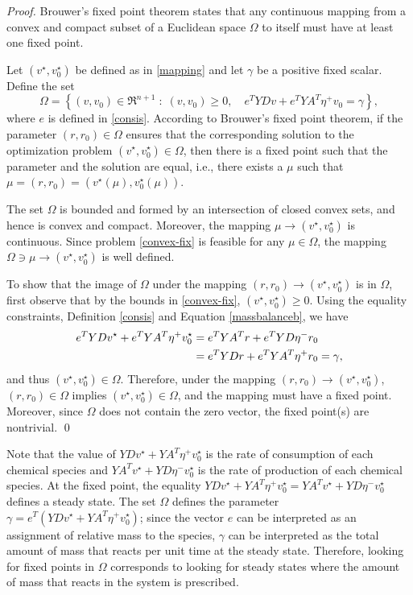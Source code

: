 \documentclass[smallextended]{svjour3}       %
\newcommand*{\0}{\mathbf{0}}
\newcommand*{\1}{\mathbf{1}}
\begin{document}
\begin{proof} 
	Brouwer's fixed point theorem states that any continuous mapping from a
	convex and compact subset of a Euclidean space $\Omega$ to itself must have
	at least one fixed point. 

	Let $(v^\star,v^\star_0)$ be defined as in \eqref{mapping} and let $\gamma$
	be a positive fixed scalar. Define the set 
	\[
	\Omega = \left\{ (v,v_0)\in	\Re^{n+1} \; : \; (v,v_0)\geq 0, 
		\quad e^TYDv + e^TYA^T\eta^+v_0 = \gamma\right\},
	\]  
	where $e$ is defined in \eqref{consis}.  According to Brouwer's fixed point
	theorem, if the parameter $(r,r_0) \in \Omega$ ensures that the corresponding
	solution to the optimization problem $(v^\star,v_0^\star) \in \Omega$, then
	there is a fixed point such that the parameter and the solution are equal,
	i.e., there exists a $\mu$ such that $\mu = (r,r_0) =
	(v^\star(\mu),v_0^\star(\mu))$.  

	The set $\Omega$ is bounded and formed by an intersection of closed convex
	sets, and hence is convex and compact.  Moreover, the mapping $\mu\rightarrow
	(v^\star,v^\star_0)$ is continuous. Since problem \eqref{convex-fix} is
	feasible for any $\mu\in\Omega$, the mapping $\Omega \ni \mu \rightarrow
	(v^\star,v^\star_0)$ is well defined.

	To show that the image of $\Omega$ under the mapping $(r,r_0) \rightarrow
	(v^\star,v_0^\star)$	is in $\Omega$, first observe that by the bounds in
	\eqref{convex-fix}, $(v^\star,v^\star_0) \ge 0$.  Using the equality
	constraints, Definition \eqref{consis} and Equation \eqref{massbalanceb},
	we have
	\begin{align}
	e^T YD v^\star + e^T YA^T \eta^+ v^\star_0 &= e^T YA^T r + e^T YD \eta^- r_0 \notag 
	\\ & = e^T YD r + e^T YA^T \eta^+r_0=\gamma, \notag 
	\end{align} 
	and thus $(v^\star,v_0^\star)\in \Omega.$
	Therefore, under the mapping $(r,r_0) \rightarrow (v^\star,v_0^\star)$,
	$(r,r_0) \in \Omega$ implies $(v^\star,v^\star_0) \in \Omega$, and the
	mapping must have a fixed point.  Moreover, since $\Omega$ does not contain
	the zero vector, the fixed point(s) are nontrivial.
    \qed
\end{proof}

Note that the value of $YDv^\star+YA^T\eta^+v^\star_0$ is the rate of
consumption of each chemical species and $YA^Tv^\star+YD\eta^-v^\star_0$ is the
rate of production of each chemical species. At the fixed point, the equality
$YDv^\star + YA^T\eta^+v^\star_0= YA^Tv^\star+YD\eta^-v^\star_0$ defines a
steady state. The set $\Omega$ defines the parameter $\gamma=e^T(YDv^\star +
YA^T\eta^+v^\star_0)$; since the vector $e$ can be interpreted as an assignment
of relative mass to the species, $\gamma$ can be interpreted as the total
amount of mass that reacts per unit time at the steady state.  Therefore,
looking for fixed points in $\Omega$ corresponds to looking for steady states
where the amount of mass that reacts in the system is prescribed.
\end{document}
